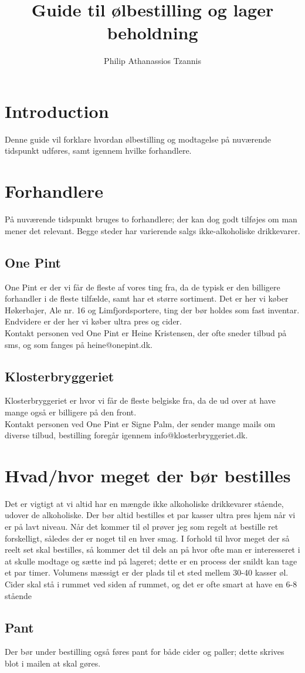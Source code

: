 

\title{Guide til ølbestilling og lager beholdning}
\author{Philip Athanassios Tzannis}
\date{}



\maketitle

\section{Introduction}
Denne guide vil forklare hvordan ølbestilling og modtagelse på nuværende tidspunkt udføres, samt igennem hvilke forhandlere.

\section{Forhandlere}
På nuværende tidspunkt bruges to forhandlere; der kan dog godt tilføjes om man mener det relevant. Begge steder har varierende salgs ikke-alkoholiske drikkevarer.
\subsection{One Pint}
One Pint er der vi får de fleste af vores ting fra, da de typisk er den billigere forhandler i de fleste tilfælde, samt har et større sortiment. Det er her vi køber Høkerbajer, Ale nr. 16 og Limfjordsportere, ting der bør holdes som fast inventar. Endvidere er der her vi køber ultra pres og cider.\\
Kontakt personen ved One Pint er Heine Kristensen, der ofte sneder tilbud på sms, og som fanges på heine@onepint.dk.
\subsection{Klosterbryggeriet}
Klosterbryggeriet er hvor vi får de fleste belgiske fra, da de ud over at have mange også er billigere på den front.\\
Kontakt personen ved One Pint er Signe Palm, der sender mange mails om diverse tilbud, bestilling foregår igennem info@klosterbryggeriet.dk.

\section{Hvad/hvor meget der bør bestilles}
Det er vigtigt at vi altid har en mængde ikke alkoholiske drikkevarer stående, udover de alkoholiske. Der bør altid bestilles et par kasser ultra pres hjem når vi er på lavt niveau. Når det kommer til øl prøver jeg som regelt at bestille ret forskelligt, således der er noget til en hver smag. I forhold til hvor meget der så reelt set skal bestilles, så kommer det til dels an på hvor ofte man er interesseret i at skulle modtage og sætte ind på lageret; dette er en process der snildt kan tage et par timer. Volumens mæssigt er der plads til et sted mellem 30-40 kasser øl. Cider skal stå i rummet ved siden af rummet, og det er ofte smart at have en 6-8 stående
\subsection{Pant}
Der bør under bestilling også føres pant for både cider og paller; dette skrives blot i mailen at skal gøres.


